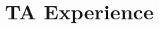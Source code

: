 \documentclass[12pt,a4paper,sans]{moderncv}        %
\begin{document}
\begin{itemize}


 
% 

\end{itemize}

\section{TA Experience}

\vspace{6pt}
\end{document}
